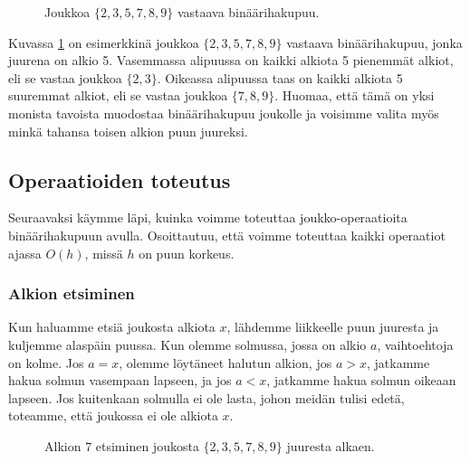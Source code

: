 \begin{figure}
\center
{}
\caption{Joukkoa $\{2,3,5,7,8,9\}$ vastaava binäärihakupuu.}
\label{fig:bihpuu}
\end{figure}

Kuvassa \ref{fig:bihpuu} on esimerkkinä
joukkoa $\{2,3,5,7,8,9\}$ vastaava binääri\-hakupuu,
jonka juurena on alkio 5.
Vasemmassa alipuussa on kaikki alkiota 5
pienemmät alkiot, eli se vastaa joukkoa $\{2,3\}$.
Oikeassa alipuussa taas on kaikki alkiota 5
suuremmat alkiot, eli se vastaa joukkoa $\{7,8,9\}$.
Huomaa, että tämä on yksi monista tavoista muodostaa
binäärihakupuu joukolle ja voisimme valita myös
minkä tahansa toisen alkion puun juureksi.

\subsection{Operaatioiden toteutus}

Seuraavaksi käymme läpi, kuinka voimme toteuttaa
joukko-operaatioita bi\-näärihakupuun avulla.
Osoittautuu, että voimme toteuttaa kaikki
operaatiot ajassa $O(h)$, missä $h$ on puun korkeus.

\subsubsection{Alkion etsiminen}

Kun haluamme etsiä joukosta alkiota $x$, lähdemme liikkeelle
puun juuresta ja kuljemme alaspäin puussa.
Kun olemme solmussa, jossa on alkio $a$,
vaihtoehtoja on kolme.
Jos $a=x$, olemme löytäneet halutun alkion,
jos $a>x$, jatkamme hakua solmun vasempaan lapseen,
ja jos $a<x$, jatkamme hakua solmun oikeaan lapseen.
Jos kuitenkaan solmulla ei ole lasta,
johon meidän tulisi edetä, toteamme,
että joukossa ei ole alkiota $x$.

\begin{figure}
\center
{}
\caption{Alkion $7$ etsiminen joukosta $\{2,3,5,7,8,9\}$ juuresta alkaen.}
\label{fig:bihets}
\end{figure}

